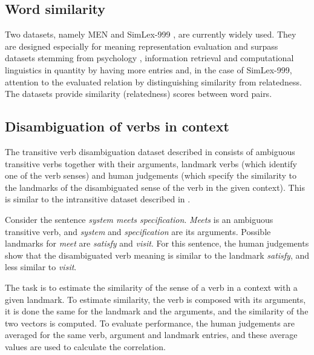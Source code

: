 \subsection{Word similarity}
\label{sec:lexical-similarity}

Two datasets, namely MEN \cite{Bruni:2012:DST:2390524.2390544} and SimLex-999 \cite{hill2014simlex}, are currently widely used. They are designed especially for meaning representation evaluation and surpass datasets stemming from psychology \cite{1986-13502-00119860101}, information retrieval \cite{2002:PSC:503104.503110} and computational linguistics \cite{Rubenstein:1965:CCS:365628.365657} in quantity by having more entries and, in the case of SimLex-999, attention to the evaluated relation by distinguishing similarity from relatedness. The datasets provide similarity (relatedness) scores between word pairs.
%
%
%

\subsection{Disambiguation of verbs in context}
\label{sec:disamb}

The transitive verb disambiguation dataset
described in  consists of ambiguous transitive verbs together with their arguments, landmark verbs (which identify one of the verb senses) and human judgements (which specify the similarity to the landmarks of the disambiguated sense of the verb in the given context). This is similar to the intransitive dataset described in .

Consider the sentence \textit{system meets specification}. \textit{Meets} is an ambiguous transitive verb, and \textit{system}
and \textit{specification} are its arguments. Possible landmarks for \emph{meet} are \textit{satisfy} and \textit{visit}. For this sentence, the human judgements show that the disambiguated verb meaning is similar to the landmark \textit{satisfy}, and less similar to \textit{visit}.

The task is to estimate the similarity of the sense of a verb in a context with a given landmark. To estimate similarity, the verb is composed with its arguments, it is done the same for the landmark and the arguments, and the similarity of the two vectors is computed. To evaluate performance, the human judgements are averaged for the same verb, argument and landmark entries, and these average values are used to calculate the correlation.

